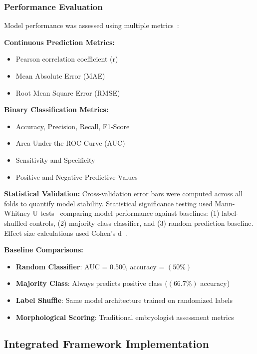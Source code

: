 \documentclass[pdflatex,sn-basic]{sn-jnl}%
\begin{document}
\subsubsection{Performance Evaluation}

Model performance was assessed using multiple metrics~\cite{litjens2017survey}:

\textbf{Continuous Prediction Metrics:}
\begin{itemize}
\item Pearson correlation coefficient (r)
\item Mean Absolute Error (MAE) 
\item Root Mean Square Error (RMSE)
\end{itemize}

\textbf{Binary Classification Metrics:}
\begin{itemize}
\item Accuracy, Precision, Recall, F1-Score
\item Area Under the ROC Curve (AUC)
\item Sensitivity and Specificity
\item Positive and Negative Predictive Values
\end{itemize}

\textbf{Statistical Validation:}
Cross-validation error bars were computed across all folds to quantify model stability. Statistical significance testing used Mann-Whitney U tests~\cite{mann1947test} comparing model performance against baselines: (1) label-shuffled controls, (2) majority class classifier, and (3) random prediction baseline. Effect size calculations used Cohen's d~\cite{cohen1988statistical}. 

\textbf{Baseline Comparisons:}
\begin{itemize}
\item \textbf{Random Classifier}: AUC = 0.500, accuracy = $(50\%)$
\item \textbf{Majority Class}: Always predicts positive class ($(66.7\%)$ accuracy)
\item \textbf{Label Shuffle}: Same model architecture trained on randomized labels
\item \textbf{Morphological Scoring}: Traditional embryologist assessment metrics
\end{itemize}

\subsection{Integrated Framework Implementation}
\end{document}

